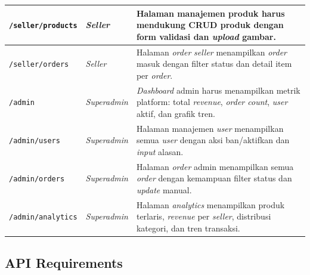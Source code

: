 \begin{longtable}{|L{4cm}|L{2.5cm}|L{8cm}|}
    \hline
    \texttt{/seller/products}
        & \textit{Seller}
        & Halaman manajemen produk harus mendukung CRUD produk dengan form
          validasi dan \textit{upload} gambar. \\
    \hline
    \texttt{/seller/orders}
        & \textit{Seller}
        & Halaman \textit{order} \textit{seller} menampilkan \textit{order} masuk
          dengan filter status dan detail item per \textit{order}. \\
    \hline
    \texttt{/admin}
        & \textit{Superadmin}
        & \textit{Dashboard} admin harus menampilkan metrik platform: total
          \textit{revenue}, \textit{order count}, \textit{user} aktif, dan grafik
          tren. \\
    \hline
    \texttt{/admin/users}
        & \textit{Superadmin}
        & Halaman manajemen \textit{user} menampilkan semua \textit{user} dengan
          aksi ban/aktifkan dan \textit{input} alasan. \\
    \hline
    \texttt{/admin/orders}
        & \textit{Superadmin}
        & Halaman \textit{order} admin menampilkan semua \textit{order} dengan
          kemampuan filter status dan \textit{update} manual. \\
    \hline
    \texttt{/admin/analytics}
        & \textit{Superadmin}
        & Halaman \textit{analytics} menampilkan produk terlaris,
          \textit{revenue} per \textit{seller}, distribusi kategori, dan tren
          transaksi. \\
    \hline
\end{longtable}

\subsection{API Requirements}

